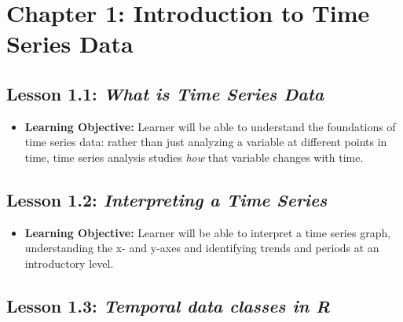 \documentclass[
]{book}
\providecommand{\tightlist}{%
  \setlength{\itemsep}{0pt}\setlength{\parskip}{0pt}}
\begin{document}
\hypertarget{chapter-1-introduction-to-time-series-data}{%
\section*{Chapter 1: Introduction to Time Series Data}\label{chapter-1-introduction-to-time-series-data}}

\hypertarget{lesson-1.1-what-is-time-series-data}{%
\subsection*{\texorpdfstring{Lesson 1.1: \emph{What is Time Series Data}}{Lesson 1.1: What is Time Series Data}}\label{lesson-1.1-what-is-time-series-data}}

\begin{itemize}
\tightlist
\item
  \textbf{Learning Objective:} Learner will be able to understand the foundations of time series data: rather than just analyzing a variable at different points in time, time series analysis studies \emph{how} that variable changes with time.
\end{itemize}

\hypertarget{lesson-1.2-interpreting-a-time-series}{%
\subsection*{\texorpdfstring{Lesson 1.2: \emph{Interpreting a Time Series}}{Lesson 1.2: Interpreting a Time Series}}\label{lesson-1.2-interpreting-a-time-series}}

\begin{itemize}
\tightlist
\item
  \textbf{Learning Objective:} Learner will be able to interpret a time series graph, understanding the x- and y-axes and identifying trends and periods at an introductory level.
\end{itemize}

\hypertarget{lesson-1.3-temporal-data-classes-in-r}{%
\subsection*{\texorpdfstring{Lesson 1.3: \emph{Temporal data classes in R}}{Lesson 1.3: Temporal data classes in R}}\label{lesson-1.3-temporal-data-classes-in-r}}
\end{document}
